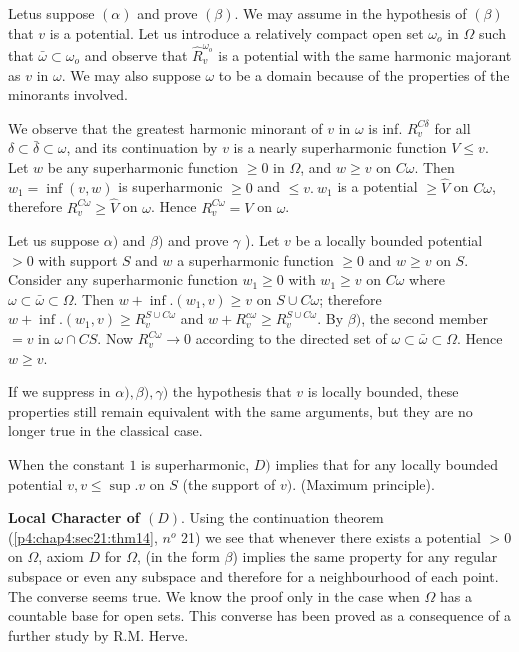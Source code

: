 Let\pageoriginale us suppose $(\alpha)$ and prove $(\beta)$. We may assume in the
hypothesis of $(\beta)$ that $v$ is a potential. Let us introduce a
relatively compact open set $\omega_o$ in $\Omega$ such that
$\bar{\omega} \subset \omega_o$ and observe that
$\hat{R}^{\omega_o}_v$ is a potential with the same harmonic majorant
as $v$ in $\omega$. We may also suppose $\omega$ to be a domain
because of the properties of the minorants involved. 

We observe that the greatest harmonic minorant of $v$ in $\omega$ is
inf. $R_v^{C \delta}$ for all $\delta \subset \bar{\delta} \subset
\omega$, and its continuation by $v$ is a nearly superharmonic
function $V \le v$. Let $w$ be any superharmonic function $\ge 0$ in
$\Omega$, and $w \ge v$ on $C \omega$. Then $w_1 = \inf (v, w)$ is
superharmonic $\ge 0$ and $\le v. ~ w_1$ is a potential $ \ge \hat{V}$
on $C \omega$, therefore $R^{C \omega}_v \ge \hat{V}$ on
$\omega$. Hence $R^{C \omega }_v = V$ on $\omega$. 

Let us suppose $\alpha )$ and $\beta )$ and prove $\gamma$ ). Let $v$
be a locally bounded potential $> 0$ with support $S$ and $w$ a
superharmonic function $\ge 0$ and $w \ge v$ on $S$. Consider any
superharmonic function $w_1 \ge 0$ with $w_1 \ge v$ on $C \omega$
where $\omega \subset \bar{\omega} \subset \Omega$. Then $w +
\inf. (w_1, v) \ge v$ on $S \cup C \omega$; therefore $w + \inf.(w_1,
v) \ge R^{S \cup C \omega}_v$ and $w + R^{c \omega}_v \ge R^{S \cup C
  \omega}_v$. By $\beta )$, the second member $= v$ in $\omega \cap
CS$. Now $R^{C \omega}_v \to 0$ according to the directed set of $
\omega \subset \bar{\omega} \subset \Omega$. Hence $w \ge v$. 

\setcounter{remark}{0}
\begin{remark}\label{p4:chap8:sec34:rem1} %
  If we suppress in $\alpha ), \beta), \gamma)$ the hypothesis that
  $v$ is locally bounded, these properties still remain equivalent
  with the same arguments, but they are no longer true in the
  classical case. 
 \end{remark}

\begin{remark}\label{p4:chap8:sec34:rem2} %
  When the constant $1$ is superharmonic, $D)$ implies that for any\pageoriginale
  locally bounded potential $v, v \le \sup.  v$ on $S$ (the support of
  $v)$. (Maximum principle). 
\end{remark}

\noindent
\textbf{Local Character of $(D)$}. Using the continuation theorem
(\ref{p4:chap4:sec21:thm14}, $n^o$ 21) we see that whenever there
exists a potential $> 0$ on 
$\Omega$, axiom $D$ for $\Omega$, (in the form $\beta$) implies the
same property for any regular subspace or even any subspace and
therefore for a neighbourhood of  each point. The converse seems
true. We know the proof only in the case when $\Omega$ has a countable
base for open sets. This converse has been proved as a consequence of
a further study by R.M. Herve. 

